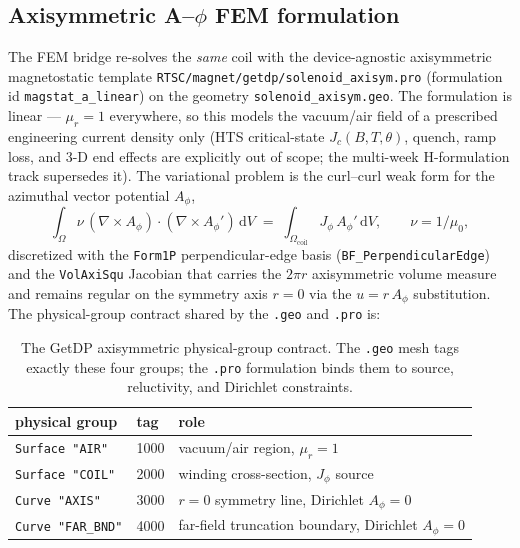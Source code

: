 \subsection{Axisymmetric A--$\phi$ FEM formulation}
\label{app:magnet:fem}

The FEM bridge re-solves the \emph{same} coil with the device-agnostic
axisymmetric magnetostatic template \texttt{RTSC/magnet/getdp/solenoid\_axisym.pro}
(formulation id \texttt{magstat\_a\_linear}) on the geometry
\texttt{solenoid\_axisym.geo}. The formulation is linear --- $\mu_r=1$
everywhere, so this models the vacuum/air field of a prescribed engineering
current density only (HTS critical-state $J_c(B,T,\theta)$, quench, ramp loss,
and 3-D end effects are explicitly out of scope; the multi-week H-formulation
track supersedes it). The variational problem is the curl--curl weak form for
the azimuthal vector potential $A_\phi$,
\begin{equation}
\int_{\Omega} \nu\,(\nabla\times A_\phi)\cdot(\nabla\times A_\phi')\,
  \mathrm{d}V \;=\; \int_{\Omega_{\text{coil}}} J_\phi\,A_\phi'\,\mathrm{d}V,
\qquad \nu = 1/\mu_0,
\label{eq:app:weak}
\end{equation}
discretized with the \texttt{Form1P} perpendicular-edge basis
(\texttt{BF\_PerpendicularEdge}) and the \texttt{VolAxiSqu} Jacobian that
carries the $2\pi r$ axisymmetric volume measure and remains regular on the
symmetry axis $r=0$ via the $u = r\,A_\phi$ substitution. The physical-group
contract shared by the \texttt{.geo} and \texttt{.pro} is:

\begin{table}[h]
\centering
\small
\begin{tabular}{lll}
\toprule
physical group & tag & role \\
\midrule
\texttt{Surface "AIR"}  & 1000 & vacuum/air region, $\mu_r=1$ \\
\texttt{Surface "COIL"} & 2000 & winding cross-section, $J_\phi$ source \\
\texttt{Curve "AXIS"}   & 3000 & $r=0$ symmetry line, Dirichlet $A_\phi=0$ \\
\texttt{Curve "FAR\_BND"} & 4000 & far-field truncation boundary, Dirichlet $A_\phi=0$ \\
\bottomrule
\end{tabular}
\caption{The GetDP axisymmetric physical-group contract. The
\texttt{.geo} mesh tags exactly these four groups; the \texttt{.pro}
formulation binds them to source, reluctivity, and Dirichlet constraints.}
\label{tab:app:contract}
\end{table}

